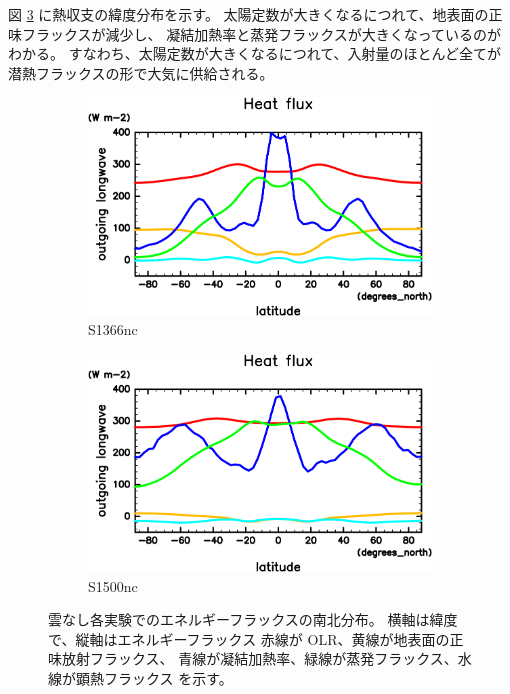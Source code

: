 \documentclass[body]{subfiles}
\begin{document}
図 \ref{EnFlx南北分布nc} に熱収支の緯度分布を示す。
太陽定数が大きくなるにつれて、地表面の正味フラックスが減少し、
凝結加熱率と蒸発フラックスが大きくなっているのがわかる。
すなわち、太陽定数が大きくなるにつれて、入射量のほとんど全てが
潜熱フラックスの形で大気に供給される。

\begin{figure}[t]
	\centering
	\begin{subfigure}{.4\textwidth}
		\centering
		\includegraphics[width=\textwidth]{S1366-nc/HeatFlx,time=3650:4015-crop-rotate.pdf}
		\caption{S1366nc}\label{EnFlx南北分布S1366nc}
	\end{subfigure}
	\begin{subfigure}{.4\textwidth}
		\centering
		\includegraphics[width=\textwidth]{S1500-nc/HeatFlx,time=3650:4015-crop-rotate.pdf}
		\caption{S1500nc}\label{EnFlx南北分布S1500nc}
	\end{subfigure}
	\caption[雲なし各実験でのエネルギーフラックス南北分布]{
		雲なし各実験でのエネルギーフラックスの南北分布。
		横軸は緯度で、縦軸はエネルギーフラックス\hmu*{[W/m^{-2}]}
		赤線が OLR、黄線が地表面の正味放射フラックス、
		青線が凝結加熱率、緑線が蒸発フラックス、水線が顕熱フラックス
		を示す。
	}\label{EnFlx南北分布nc}
\end{figure}
\end{document}
